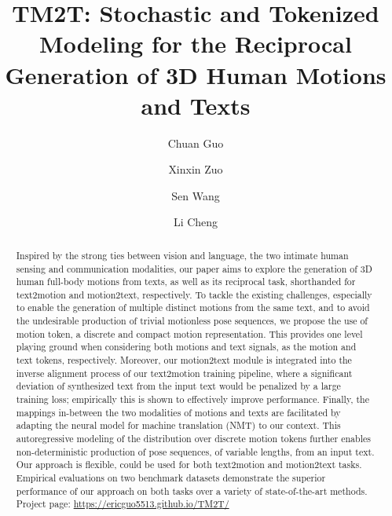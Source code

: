 \documentclass[runningheads]{llncs}
\begin{document}
\pagestyle{headings}
\mainmatter
\def\ECCVSubNumber{650}  

\title{TM2T: Stochastic and Tokenized Modeling for the Reciprocal Generation of 3D Human Motions and Texts} 

\begin{comment}
\titlerunning{ECCV-22 submission ID \ECCVSubNumber} 
\authorrunning{ECCV-22 submission ID \ECCVSubNumber} 
\author{Chuan Guo}
\author{Xinxin Zuo}
\institute{Paper ID \ECCVSubNumber}
\end{comment}


\author{Chuan Guo \and Xinxin Zuo \and Sen Wang \and Li Cheng}


\maketitle

\begin{abstract}
Inspired by the strong ties between vision and language, the two intimate human sensing and communication modalities, our paper aims to explore the generation of 3D human full-body motions from texts, as well as its reciprocal task, shorthanded for text2motion and motion2text, respectively. To tackle the existing challenges, especially to enable the generation of multiple distinct motions from the same text, and to avoid the undesirable production of trivial motionless pose sequences, we propose the use of motion token, a discrete and compact motion representation. This provides one level playing ground when considering both motions and text signals, as the motion and text tokens, respectively. 
Moreover, our motion2text module is integrated into the inverse alignment process of our text2motion training pipeline, where a significant deviation of synthesized text from the input text would be penalized by a large training loss; empirically this is shown to effectively improve performance. Finally, the mappings in-between the two modalities of motions and texts are facilitated by adapting the neural model for machine translation (NMT) to our context. This autoregressive modeling of the distribution over discrete motion tokens further enables non-deterministic production of pose sequences, of variable lengths, from an input text. 
Our approach is flexible, could be used for both text2motion and motion2text tasks. 
Empirical evaluations on two benchmark datasets demonstrate the superior performance of our approach on both tasks over a variety of state-of-the-art methods. Project page: \href{https://ericguo5513.github.io/TM2T/}{https://ericguo5513.github.io/TM2T/}



\end{abstract}
\end{document}
